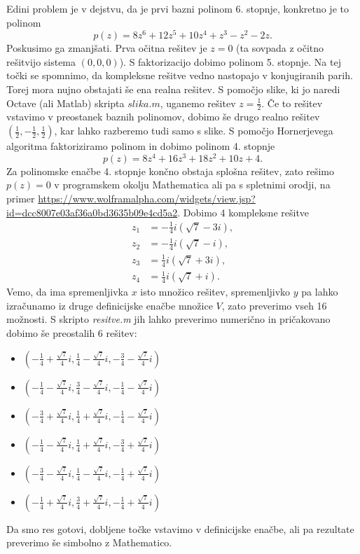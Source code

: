 \documentclass[a4paper, 12pt]{article} %
\begin{document}
\begin{enumerate}[label=(\alph*)]
	Edini problem je v dejstvu, da je prvi bazni polinom 6. stopnje, konkretno je to polinom
	\[
	p(z) = 8z^6+12z^5+10z^4+z^3-z^2-2z.
	\]
	Poskusimo ga zmanjšati. Prva očitna rešitev je $z = 0$ (ta sovpada z očitno rešitvijo sistema $(0, 0, 0)$). S faktorizacijo dobimo polinom 5. stopnje. Na tej točki se spomnimo, da kompleksne rešitve vedno nastopajo v konjugiranih parih. Torej mora nujno obstajati še ena realna rešitev. S pomočjo slike, ki jo naredi Octave (ali Matlab) skripta $slika.m$, uganemo rešitev $z = \frac{1}{2}$. Če to rešitev vstavimo v preostanek baznih polinomov, dobimo še drugo realno rešitev $(\frac{1}{2}, -\frac{1}{2}, \frac{1}{2})$, kar lahko razberemo tudi samo s slike. S pomočjo Hornerjevega algoritma faktoriziramo polinom in dobimo polinom 4. stopnje
	\[
	p(z) = 8z^4 + 16z^3 + 18z^2 + 10z + 4.
	\] 
	Za polinomske enačbe 4. stopnje končno obstaja splošna rešitev, zato rešimo $p(z) = 0$ v programskem okolju Mathematica ali pa s spletnimi orodji, na primer \url{https://www.wolframalpha.com/widgets/view.jsp?id=dcc8007e03af36a0bd3635b09e4cd5a2}.
	Dobimo 4 kompleksne rešitve
	\begin{align*}
	z_1 &= -\frac{1}{4}i(\sqrt{7} - 3i), \\
	z_2 &= -\frac{1}{4}i(\sqrt{7} - i), \\
	z_3 &= \frac{1}{4}i(\sqrt{7} + 3i), \\
	z_4 &= \frac{1}{4}i(\sqrt{7} + i).
	\end{align*}
	Vemo, da ima spremenljivka $x$ isto množico rešitev, spremenljivko $y$ pa lahko izračunamo iz druge definicijske enačbe množice $V$, zato preverimo vseh 16 možnosti. S skripto \textit{resitve.m} jih lahko preverimo numerično in pričakovano dobimo še preostalih 6 rešitev:
	\begin{itemize}
		\item $(-\frac{1}{4} + \frac{\sqrt{7}}{4}i, \frac{1}{4} - \frac{\sqrt{7}}{4}i, -\frac{3}{4} - \frac{\sqrt{7}}{4}i)$
		\item $(-\frac{1}{4} - \frac{\sqrt{7}}{4}i, \frac{3}{4} - \frac{\sqrt{7}}{4}i, -\frac{1}{4} - \frac{\sqrt{7}}{4}i)$
		\item $(-\frac{3}{4} + \frac{\sqrt{7}}{4}i, \frac{1}{4} + \frac{\sqrt{7}}{4}i, -\frac{1}{4} - \frac{\sqrt{7}}{4}i)$
		\item $(-\frac{1}{4} - \frac{\sqrt{7}}{4}i, \frac{1}{4} + \frac{\sqrt{7}}{4}i, -\frac{3}{4} + \frac{\sqrt{7}}{4}i)$
		\item $(-\frac{3}{4} - \frac{\sqrt{7}}{4}i, \frac{1}{4} - \frac{\sqrt{7}}{4}i, -\frac{1}{4} + \frac{\sqrt{7}}{4}i)$
		\item $(-\frac{1}{4} + \frac{\sqrt{7}}{4}i, \frac{3}{4} + \frac{\sqrt{7}}{4}i, -\frac{1}{4} + \frac{\sqrt{7}}{4}i)$
	\end{itemize}
	Da smo res gotovi, dobljene točke vstavimo v definicijske enačbe, ali pa rezultate preverimo še simbolno z Mathematico.
\end{enumerate}
\end{document}
